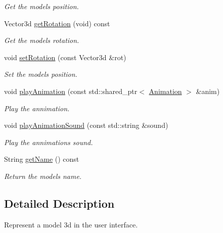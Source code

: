 \begin{DoxyCompactItemize}
\begin{DoxyCompactList}\small\item\em Get the model\textquotesingle{}s position. \end{DoxyCompactList}\item 
\mbox{\label{classModel3d_a10401849cf36b84946774602e73c7ac9}} 
Vector3d \hyperlink{classModel3d_a10401849cf36b84946774602e73c7ac9}{get\+Rotation} (void) const
\begin{DoxyCompactList}\small\item\em Get the model\textquotesingle{}s rotation. \end{DoxyCompactList}\item 
void \hyperlink{classModel3d_adc3c185a679687b4bf483f89eb2c20a9}{set\+Rotation} (const Vector3d \&rot)
\begin{DoxyCompactList}\small\item\em Set the model\textquotesingle{}s position. \end{DoxyCompactList}\item 
void \hyperlink{classModel3d_a108ab9c13b7ae24cc1711c2e97fbc625}{play\+Animation} (const std\+::shared\+\_\+ptr$<$ \hyperlink{structModel3d_1_1Animation}{Animation} $>$ \&anim)
\begin{DoxyCompactList}\small\item\em Play the annimation. \end{DoxyCompactList}\item 
void \hyperlink{classModel3d_a6ce79286c43bd4a6852c544bdad8ee18}{play\+Animation\+Sound} (const std\+::string \&sound)
\begin{DoxyCompactList}\small\item\em Play the annimation\textquotesingle{}s sound. \end{DoxyCompactList}\item 
\mbox{\label{classModel3d_afa0ccf1c5b0c571afcfbef4a894e6b3a}} 
String \hyperlink{classModel3d_afa0ccf1c5b0c571afcfbef4a894e6b3a}{get\+Name} () const
\begin{DoxyCompactList}\small\item\em Return the model\textquotesingle{}s name. \end{DoxyCompactList}\end{DoxyCompactItemize}


\subsection{Detailed Description}
Represent a model 3d in the user interface. 

